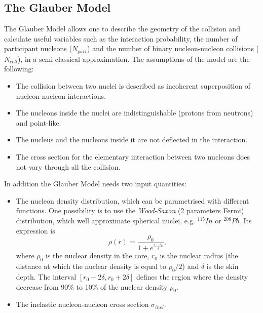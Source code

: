 \documentclass[b5paper,10pt,twoside,oldstyle,classica]{toptesi}
\begin{document}
\subsection{The Glauber Model}
The Glauber Model \cite{Miller:2007ri} allows one to describe the geometry of the collision and calculate useful variables such as the interaction probability, the number of participant nucleons ($N_{part}$) and the number of binary nucleon-nucleon collisions ($N_{coll}$), in a semi-classical approximation.
The assumptions of the model are the following:
\begin{itemize}
 \item The collision between two nuclei is described as incoherent superposition of nucleon-nucleon interactions.
 \item The nucleons inside the nuclei are indistinguishable (protons from neutrons) and point-like.
 \item The nucleus and the nucleons inside it are not deflected in the interaction.
 \item The cross section for the elementary interaction between two nucleons does not vary through all the collision. 
\end{itemize}
In addition the Glauber Model needs two input quantities:
\begin{itemize}
 \item The nucleon density distribution, which can be parametrised with different functions. One possibility is to use the \textit{Wood-Saxon} (2 parameters Fermi) distribution, which well approximate spherical nuclei, e.g. $^{115}In$ or $^{208}Pb$. Its expression is
 \begin{equation}
\rho(r) = \frac{\rho_0}{1+e^{\frac{r-r_0}{\delta}}},
 \end{equation}
where $\rho_0$ is the nuclear density in the core, $r_0$ is the nuclear radius (the distance at which the nuclear density is equal to $\rho_0/2$) and $\delta$ is the skin depth. The interval $[r_0-2\delta,r_0+2\delta]$ defines the region where the density decrease from 90\% to 10\% of the nuclear density $\rho_0$.
 \item The inelastic nucleon-nucleon cross section $\sigma_{inel}$. 
\end{itemize}
\end{document}

